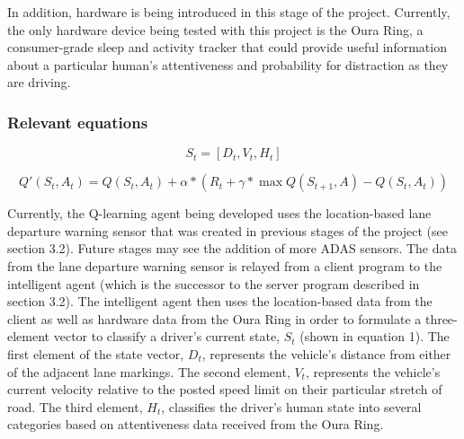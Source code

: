 \documentclass[12pt]{article}
\renewcommand{\_}{\kern-1.5pt\textunderscore\kern-1.5pt}
\begin{document}
\vspace{\baselineskip}

In addition, hardware is being introduced in this stage of the project. Currently, the only hardware device being tested with this project is the Oura Ring, a consumer-grade sleep and activity tracker that could provide useful information about a particular human's attentiveness and probability for distraction as they are driving.

\vspace{\baselineskip}

\subsubsection{Relevant equations}
\begin{equation}
        S_{t} = [D_{t}, V_{t}, H_{t}]
\end{equation}

\begin{equation}
        Q'(S_{t} , A_{t}) =  Q(S_{t} , A_{t}) + \alpha * (R_{t} + \gamma * \max Q(S_{t+1}, A) - Q(S_{t}, A_{t}))
\end{equation}

\vspace{\baselineskip}

Currently, the Q-learning agent being developed uses the location-based lane departure warning sensor that was created in previous stages of the project (see section 3.2). Future stages may see the addition of more ADAS sensors. The data from the lane departure warning sensor is relayed from a client program to the intelligent agent (which is the successor to the server program described in section 3.2). The intelligent agent then uses the location-based data from the client as well as hardware data from the Oura Ring in order to formulate a three-element vector to classify a driver's current state, $S_{t}$ (shown in equation 1). The first element of the state vector, $D_{t}$, represents the vehicle's distance from either of the adjacent lane markings. The second element, $V_{t}$, represents the vehicle's current velocity relative to the posted speed limit on their particular stretch of road. The third element, $H_{t}$, classifies the driver's human state into several categories based on attentiveness data received from the Oura Ring. \par 

\vspace{\baselineskip}
\end{document}
